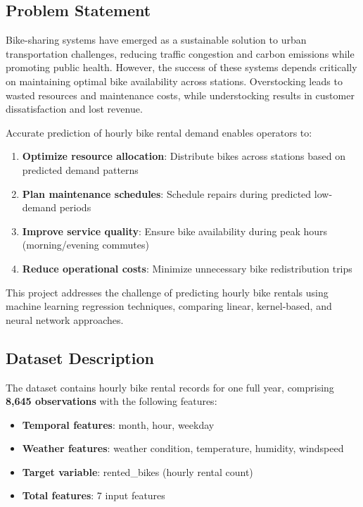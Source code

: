 \documentclass[conference]{IEEEtran}
\begin{document}
\subsection{Problem Statement}
Bike-sharing systems have emerged as a sustainable solution to urban transportation challenges, reducing traffic congestion and carbon emissions while promoting public health. However, the success of these systems depends critically on maintaining optimal bike availability across stations. Overstocking leads to wasted resources and maintenance costs, while understocking results in customer dissatisfaction and lost revenue.

Accurate prediction of hourly bike rental demand enables operators to:
\begin{enumerate}
    \item \textbf{Optimize resource allocation}: Distribute bikes across stations based on predicted demand patterns
    \item \textbf{Plan maintenance schedules}: Schedule repairs during predicted low-demand periods
    \item \textbf{Improve service quality}: Ensure bike availability during peak hours (morning/evening commutes)
    \item \textbf{Reduce operational costs}: Minimize unnecessary bike redistribution trips
\end{enumerate}

This project addresses the challenge of predicting hourly bike rentals using machine learning regression techniques, comparing linear, kernel-based, and neural network approaches.

\subsection{Dataset Description}
The dataset contains hourly bike rental records for one full year, comprising \textbf{8,645 observations} with the following features:
\begin{itemize}
    \item \textbf{Temporal features}: month, hour, weekday
    \item \textbf{Weather features}: weather condition, temperature, humidity, windspeed
    \item \textbf{Target variable}: rented\_bikes (hourly rental count)
    \item \textbf{Total features}: 7 input features
\end{itemize}
\end{document}
